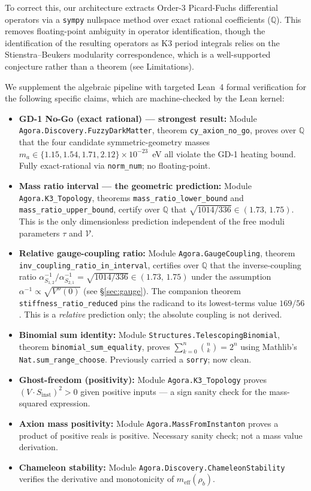 \documentclass[11pt,a4paper]{article}
\begin{document}
To correct this, our architecture extracts Order-3 Picard-Fuchs differential operators via a \texttt{sympy} nullspace method over exact rational coefficients ($\mathbb{Q}$). This removes floating-point ambiguity in operator identification, though the identification of the resulting operators as K3 period integrals relies on the Stienstra--Beukers modularity correspondence, which is a well-supported conjecture rather than a theorem (see Limitations).

We supplement the algebraic pipeline with targeted Lean~4 formal verification for the following specific claims, which are machine-checked by the Lean kernel:
\begin{itemize}
  \item \textbf{GD-1 No-Go (exact rational) — strongest result:} Module \texttt{Agora.Discovery.FuzzyDarkMatter}, theorem \texttt{cy\_axion\_no\_go}, proves over $\mathbb{Q}$ that the four candidate symmetric-geometry masses $m_a \in \{1.15, 1.54, 1.71, 2.12\} \times 10^{-23}$~eV all violate the GD-1 heating bound. Fully exact-rational via \texttt{norm\_num}; no floating-point.
  \item \textbf{Mass ratio interval — the geometric prediction:} Module \texttt{Agora.K3\_Topology}, theorems \texttt{mass\_ratio\_lower\_bound} and \texttt{mass\_ratio\_upper\_bound}, certify over $\mathbb{Q}$ that $\sqrt{1014/336} \in (1.73,\, 1.75)$. This is the only dimensionless prediction independent of the free moduli parameters $\tau$ and $\mathcal{V}$.
  \item \textbf{Relative gauge-coupling ratio:} Module \texttt{Agora.GaugeCoupling}, theorem \texttt{inv\_coupling\_ratio\_in\_interval}, certifies over $\mathbb{Q}$ that the inverse-coupling ratio $\alpha^{-1}_{S_{1,2}}/\alpha^{-1}_{S_{2,1}} = \sqrt{1014/336} \in (1.73,\,1.75)$ under the assumption $\alpha^{-1}\propto\sqrt{V''(0)}$ (see §\ref{sec:gauge}). The companion theorem \texttt{stiffness\_ratio\_reduced} pins the radicand to its lowest-terms value $169/56$. This is a \emph{relative} prediction only; the absolute coupling is not derived.
  \item \textbf{Binomial sum identity:} Module \texttt{Structures.TelescopingBinomial}, theorem \texttt{binomial\_sum\_equality}, proves $\sum_{k=0}^n \binom{n}{k} = 2^n$ using Mathlib's \texttt{Nat.sum\_range\_choose}. Previously carried a \texttt{sorry}; now clean.
  \item \textbf{Ghost-freedom (positivity):} Module \texttt{Agora.K3\_Topology} proves $(V \cdot S_{\mathrm{inst}})^2 > 0$ given positive inputs — a sign sanity check for the mass-squared expression.
  \item \textbf{Axion mass positivity:} Module \texttt{Agora.MassFromInstanton} proves a product of positive reals is positive. Necessary sanity check; not a mass value derivation.
  \item \textbf{Chameleon stability:} Module \texttt{Agora.Discovery.ChameleonStability} verifies the derivative and monotonicity of $m_\mathrm{eff}(\rho_b)$.
\end{itemize}
\end{document}
